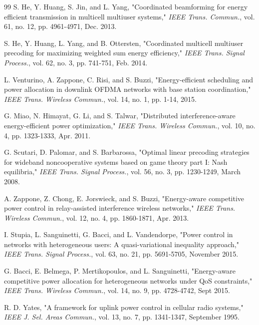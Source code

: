 \documentclass[conference]{IEEEtran}
\begin{document}
\begin{thebibliography}{99}
 S. He, Y. Huang, S. Jin, and L. Yang, "Coordinated beamforming for energy efficient transmission in multicell multiuser systems," \textit{IEEE Trans. Commun.}, vol. 61, no. 12, pp. 4961-4971, Dec. 2013.

 S. He, Y. Huang, L. Yang, and B. Ottersten, "Coordinated multicell multiuser precoding for maximizing weighted sum energy efficiency," \textit{IEEE Trans. Signal Process.}, vol. 62, no. 3, pp. 741-751, Feb. 2014.

 L. Venturino, A. Zappone, C. Risi, and S. Buzzi, "Energy-efficient scheduling and power allocation in downlink OFDMA networks with base station coordination," \textit{IEEE Trans. Wireless Commun.}, vol. 14, no. 1, pp. 1-14, 2015.

 G. Miao, N. Himayat, G. Li, and S. Talwar, "Distributed interference-aware energy-efficient power optimization," \textit{IEEE Trans. Wireless Commun.}, vol. 10, no. 4, pp. 1323-1333, Apr. 2011.

 G. Scutari, D. Palomar, and S. Barbarossa, "Optimal linear precoding strategies for wideband noncooperative systems based on game theory part I: Nash equilibria," \textit{IEEE Trans. Signal Process.}, vol. 56, no. 3, pp. 1230-1249, March 2008.

 A. Zappone, Z. Chong, E. Jorswieck, and S. Buzzi, "Energy-aware competitive power control in relay-assisted interference wireless networks," \textit{IEEE Trans. Wireless Commun.}, vol. 12, no. 4, pp. 1860-1871, Apr. 2013.

 I. Stupia, L. Sanguinetti, G. Bacci, and L. Vandendorpe, "Power control in networks with heterogeneous users: A quasi-variational inequality approach," \textit{IEEE Trans. Signal Process.}, vol. 63, no. 21, pp. 5691-5705, November 2015.

 G. Bacci, E. Belmega, P. Mertikopoulos, and L. Sanguinetti, "Energy-aware competitive power allocation for heterogeneous networks under QoS constraints," \textit{IEEE Trans. Wireless Commun.}, vol. 14, no. 9, pp. 4728-4742, Sept 2015.

 R. D. Yates, "A framework for uplink power control in cellular radio systems," \textit{IEEE J. Sel. Areas Commun.}, vol. 13, no. 7, pp. 1341-1347, September 1995.

\end{thebibliography}
\end{document}
